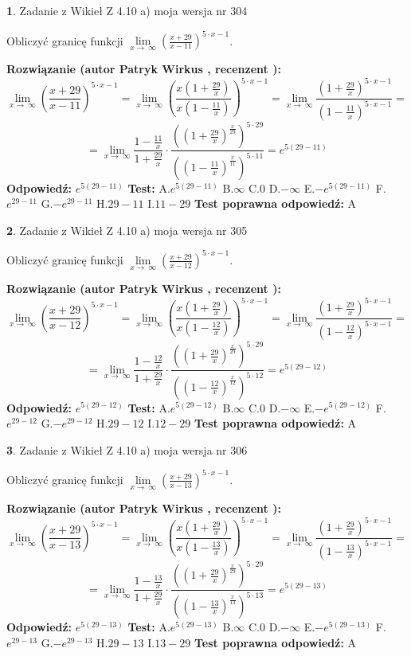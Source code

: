 \documentclass[12pt, a4paper]{article}
\theoremstyle{definition} %
\newtheorem{zad}{}
\newcommand{\zadStart}[1]{\begin{zad}#1\newline}
\newcommand{\zadStop}{\end{zad}}
\newcommand{\rozwStart}[2]{\noindent \textbf{Rozwiązanie (autor #1 , recenzent #2): }\newline}
\newcommand{\rozwStop}{\newline}
\newcommand{\odpStart}{\noindent \textbf{Odpowiedź:}\newline}
\newcommand{\odpStop}{\newline}
\newcommand{\testStart}{\noindent \textbf{Test:}\newline}
\newcommand{\testStop}{\newline}
\newcommand{\kluczStart}{\noindent \textbf{Test poprawna odpowiedź:}\newline}
\newcommand{\kluczStop}{\newline}
\begin{document}
\zadStart{Zadanie z Wikieł Z 4.10 a) moja wersja nr 304}


Obliczyć granicę funkcji  $\lim\limits_{x\to\ \infty}(\frac{x+29}{x-11})^{5\cdot x-1}$.
\zadStop
\rozwStart{Patryk Wirkus}{}
$$\lim\limits_{x\to\ \infty}(\frac{x+29}{x-11})^{5\cdot x-1} = \lim\limits_{x\to\ \infty}(\frac{x(1+\frac{29}{x})}{x(1-\frac{11}{x})})^{5\cdot x-1}=\lim\limits_{x\to\ \infty}\frac{(1+\frac{29}{x})^{5\cdot x-1}}{(1-\frac{11}{x})^{5\cdot x-1}}=$$
$$=\lim\limits_{x\to\ \infty}\frac{1-\frac{11}{x}}{1+\frac{29}{x}}\cdot\frac{((1+\frac{29}{x})^{\frac{x}{29}})^{5\cdot29}}{((1-\frac{11}{x})^{\frac{x}{11}})^{5\cdot11}}=e^{5(29-11)}$$
\rozwStop
\odpStart
$e^{5(29-11)}$
\odpStop
\testStart
A.$e^{5(29-11)}$ B.$\infty$ C.$0$ D.$-\infty$ E.$-e^{5(29-11)}$
F.$e^{29-11}$ G.$-e^{29-11}$
H.$29-11$
I.$11-29$
\testStop
\kluczStart
A
\kluczStop



\zadStart{Zadanie z Wikieł Z 4.10 a) moja wersja nr 305}


Obliczyć granicę funkcji  $\lim\limits_{x\to\ \infty}(\frac{x+29}{x-12})^{5\cdot x-1}$.
\zadStop
\rozwStart{Patryk Wirkus}{}
$$\lim\limits_{x\to\ \infty}(\frac{x+29}{x-12})^{5\cdot x-1} = \lim\limits_{x\to\ \infty}(\frac{x(1+\frac{29}{x})}{x(1-\frac{12}{x})})^{5\cdot x-1}=\lim\limits_{x\to\ \infty}\frac{(1+\frac{29}{x})^{5\cdot x-1}}{(1-\frac{12}{x})^{5\cdot x-1}}=$$
$$=\lim\limits_{x\to\ \infty}\frac{1-\frac{12}{x}}{1+\frac{29}{x}}\cdot\frac{((1+\frac{29}{x})^{\frac{x}{29}})^{5\cdot29}}{((1-\frac{12}{x})^{\frac{x}{12}})^{5\cdot12}}=e^{5(29-12)}$$
\rozwStop
\odpStart
$e^{5(29-12)}$
\odpStop
\testStart
A.$e^{5(29-12)}$ B.$\infty$ C.$0$ D.$-\infty$ E.$-e^{5(29-12)}$
F.$e^{29-12}$ G.$-e^{29-12}$
H.$29-12$
I.$12-29$
\testStop
\kluczStart
A
\kluczStop



\zadStart{Zadanie z Wikieł Z 4.10 a) moja wersja nr 306}


Obliczyć granicę funkcji  $\lim\limits_{x\to\ \infty}(\frac{x+29}{x-13})^{5\cdot x-1}$.
\zadStop
\rozwStart{Patryk Wirkus}{}
$$\lim\limits_{x\to\ \infty}(\frac{x+29}{x-13})^{5\cdot x-1} = \lim\limits_{x\to\ \infty}(\frac{x(1+\frac{29}{x})}{x(1-\frac{13}{x})})^{5\cdot x-1}=\lim\limits_{x\to\ \infty}\frac{(1+\frac{29}{x})^{5\cdot x-1}}{(1-\frac{13}{x})^{5\cdot x-1}}=$$
$$=\lim\limits_{x\to\ \infty}\frac{1-\frac{13}{x}}{1+\frac{29}{x}}\cdot\frac{((1+\frac{29}{x})^{\frac{x}{29}})^{5\cdot29}}{((1-\frac{13}{x})^{\frac{x}{13}})^{5\cdot13}}=e^{5(29-13)}$$
\rozwStop
\odpStart
$e^{5(29-13)}$
\odpStop
\testStart
A.$e^{5(29-13)}$ B.$\infty$ C.$0$ D.$-\infty$ E.$-e^{5(29-13)}$
F.$e^{29-13}$ G.$-e^{29-13}$
H.$29-13$
I.$13-29$
\testStop
\kluczStart
A
\kluczStop
\end{document}
